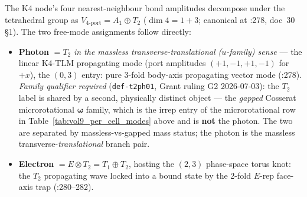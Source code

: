 The K4 node's four nearest-neighbour bond amplitudes decompose under the tetrahedral group as $V_{4\text{-port}} = A_1 \oplus T_2$ ($\dim 4 = 1 + 3$; canonical at :278, doc~30 \S 1). The two free-mode assignments follow directly:
\begin{itemize}
    \item \textbf{Photon} $= T_2$ \emph{in the massless transverse-translational ($u$-family) sense} --- the linear K4-TLM propagating mode (port amplitudes $(+1, -1, +1, -1)$ for $+x$), the $(0,3)$ entry: pure 3-fold body-axis propagating vector mode (:278). \emph{Family qualifier required} (\texttt{def-t2ph01}, Grant ruling G2 2026-07-03): the $T_2$ label is shared by a second, physically distinct object --- the \emph{gapped} Cosserat microrotational $\boldsymbol{\omega}$ family, which is the irrep entry of the microrotational row in Table~\ref{tab:vol9_per_cell_modes} above and is \textbf{not} the photon. The two are separated by massless-vs-gapped mass status; the photon is the massless transverse-\emph{translational} branch pair.
    \item \textbf{Electron} $= E \otimes T_2 = T_1 \oplus T_2$, hosting the $(2,3)$ phase-space torus knot: the $T_2$ propagating wave locked into a bound state by the 2-fold $E$-rep face-axis trap (:280--282).
\end{itemize}

